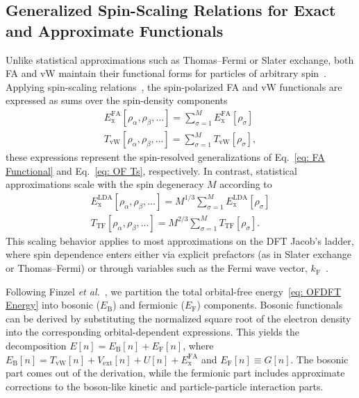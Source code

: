 \documentclass[%
 reprint,
 amsmath,amssymb,
 aps,
pra,
]{revtex4-2}
\begin{document}
\subsection{Generalized Spin-Scaling Relations for Exact and Approximate Functionals}

Unlike statistical approximations such as Thomas--Fermi or Slater exchange, both FA and vW maintain their functional forms for particles of arbitrary spin~\cite{Bosko.2023.PRA.108.052803}. Applying spin-scaling relations~\cite{Oliver.1979.PRA.20.397, Bosko.2023.PRA.108.052803}, the spin-polarized FA and vW functionals are expressed as sums over the spin-density components
\begin{gather}
    E_{\text{x}}^{\text{FA}}
    [\rho_{\alpha}, \rho_{\beta},\dots]
    =
    \sum^M_{\sigma=1}
    E_{\text{x}}^{\text{FA}}
    [\rho_{\sigma}]\\
    T_{\text{vW}}
    [\rho_{\alpha}, \rho_{\beta},\dots]
    =
    \sum^M_{\sigma=1}
    T_{\text{vW}}
    [\rho_{\sigma}],
\end{gather}
these expressions represent the spin-resolved generalizations of Eq.~\eqref{eq: FA Functional} and Eq.~\eqref{eq: OF Ts}, respectively. In contrast, statistical approximations scale with the spin degeneracy $M$ according to
\begin{gather}
    E_{\text{x}}^{\text{LDA}}
    [\rho_{\alpha}, \rho_{\beta},\dots]
    =
    M^{1/3}
    \sum^M_{\sigma=1}
    E_{\text{x}}^{\text{LDA}}
    [\rho_{\sigma}]\\
    T_{\text{TF}}
    [\rho_{\alpha}, \rho_{\beta},\dots]
    =
    M^{2/3}
    \sum^M_{\sigma=1}
    T_{\text{TF}}
    [\rho_{\sigma}].
\end{gather}
This scaling behavior applies to most approximations on the DFT Jacob's ladder, where spin dependence enters either via explicit prefactors (as in Slater exchange or Thomas--Fermi) or through variables such as the Fermi wave vector, $k_{\text{F}}$~\cite{Bosko.2023.PRA.108.052803, Parr.1989.density}.

Following Finzel \textit{et al.}~\cite{Finzel.2018.APCS.34.650}, we partition the total orbital-free energy~\eqref{eq: OFDFT Energy} into bosonic ($E_{\text{B}}$) and fermionic ($E_{\text{F}}$) components. Bosonic functionals can be derived by substituting the normalized square root of the electron density into the corresponding orbital-dependent expressions. This yields the decomposition $E[n]=E_{\text{B}}[n]+E_{\text{F}}[n]$, where $E_{\text{B}}[n]=T_{\text{vW}}[n]+V_{\text{ext}}[n]+U[n]+E_{\text{x}}^{\text{FA}}$ and $E_{\text{F}}[n]\equiv G[n]$. The bosonic part comes out of the derivation, while the fermionic part includes approximate corrections to the boson-like kinetic and particle-particle interaction parts. 
\end{document}
